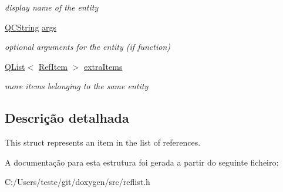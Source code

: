 \begin{DoxyCompactItemize}
\begin{DoxyCompactList}\small\item\em display name of the entity \end{DoxyCompactList}\item 
\hypertarget{struct_ref_item_a5691dacbac7b651cd43288adc0d0328b}{\hyperlink{class_q_c_string}{Q\-C\-String} \hyperlink{struct_ref_item_a5691dacbac7b651cd43288adc0d0328b}{args}}\label{struct_ref_item_a5691dacbac7b651cd43288adc0d0328b}

\begin{DoxyCompactList}\small\item\em optional arguments for the entity (if function) \end{DoxyCompactList}\item 
\hypertarget{struct_ref_item_a9310d0298d898c95c5dd638258027148}{\hyperlink{class_q_list}{Q\-List}$<$ \hyperlink{struct_ref_item}{Ref\-Item} $>$ \hyperlink{struct_ref_item_a9310d0298d898c95c5dd638258027148}{extra\-Items}}\label{struct_ref_item_a9310d0298d898c95c5dd638258027148}

\begin{DoxyCompactList}\small\item\em more items belonging to the same entity \end{DoxyCompactList}\end{DoxyCompactItemize}


\subsection{Descrição detalhada}
This struct represents an item in the list of references. 

A documentação para esta estrutura foi gerada a partir do seguinte ficheiro\-:\begin{DoxyCompactItemize}
\item 
C\-:/\-Users/teste/git/doxygen/src/reflist.\-h\end{DoxyCompactItemize}
